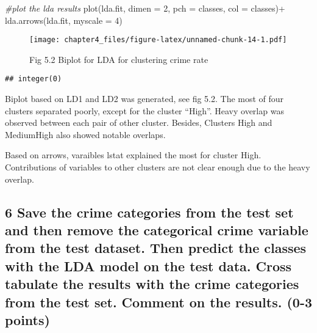 \documentclass[
]{article}
\newenvironment{Shaded}{\begin{snugshade}}{\end{snugshade}}
\newcommand{\AttributeTok}[1]{\textcolor[rgb]{0.77,0.63,0.00}{#1}}
\newcommand{\CommentTok}[1]{\textcolor[rgb]{0.56,0.35,0.01}{\textit{#1}}}
\newcommand{\DecValTok}[1]{\textcolor[rgb]{0.00,0.00,0.81}{#1}}
\newcommand{\FunctionTok}[1]{\textcolor[rgb]{0.00,0.00,0.00}{#1}}
\newcommand{\NormalTok}[1]{#1}
\newcommand{\SpecialCharTok}[1]{\textcolor[rgb]{0.00,0.00,0.00}{#1}}
\begin{document}
\begin{Shaded}
\begin{Highlighting}[]
\CommentTok{\#plot the lda results}
\FunctionTok{plot}\NormalTok{(lda.fit, }\AttributeTok{dimen =} \DecValTok{2}\NormalTok{,  }\AttributeTok{pch =}\NormalTok{ classes, }\AttributeTok{col =}\NormalTok{ classes)}\SpecialCharTok{+}
\FunctionTok{lda.arrows}\NormalTok{(lda.fit, }\AttributeTok{myscale =} \DecValTok{4}\NormalTok{)}
\end{Highlighting}
\end{Shaded}

\begin{figure}
\centering
\texttt{[image: chapter4\_files/figure-latex/unnamed-chunk-14-1.pdf]}
\caption{Fig 5.2 Biplot for LDA for clustering crime rate}
\end{figure}

\begin{verbatim}
## integer(0)
\end{verbatim}

Biplot based on LD1 and LD2 was generated, see fig 5.2. The most of four
clusters separated poorly, except for the cluster ``High''. Heavy
overlap was observed between each pair of other cluster. Besides,
Clusters High and MediumHigh also showed notable overlaps.

Based on arrows, varaibles lstat explained the most for cluster High.
Contributions of variables to other clusters are not clear enough due to
the heavy overlap.

\hypertarget{save-the-crime-categories-from-the-test-set-and-then-remove-the-categorical-crime-variable-from-the-test-dataset.-then-predict-the-classes-with-the-lda-model-on-the-test-data.-cross-tabulate-the-results-with-the-crime-categories-from-the-test-set.-comment-on-the-results.-0-3-points}{%
\subsection{6 Save the crime categories from the test set and then
remove the categorical crime variable from the test dataset. Then
predict the classes with the LDA model on the test data. Cross tabulate
the results with the crime categories from the test set. Comment on the
results. (0-3
points)}\label{save-the-crime-categories-from-the-test-set-and-then-remove-the-categorical-crime-variable-from-the-test-dataset.-then-predict-the-classes-with-the-lda-model-on-the-test-data.-cross-tabulate-the-results-with-the-crime-categories-from-the-test-set.-comment-on-the-results.-0-3-points}}
\end{document}
